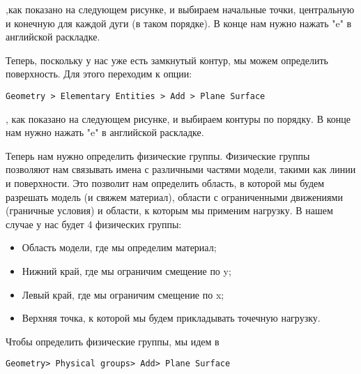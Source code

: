 \documentclass[11pt]{article}
\begin{document}
,как показано на следующем рисунке, и выбираем начальные точки, центральную и конечную для каждой дуги (в таком порядке). В конце нам нужно нажать "e" в английской раскладке.

    \begin{center}
    \end{center} 

Теперь, поскольку у нас уже есть замкнутый контур, мы можем определить поверхность. Для этого переходим к опции: 

\begin{Verbatim}[commandchars=\\\{\}]
Geometry > Elementary Entities > Add > Plane Surface
\end{Verbatim}

, как показано на следующем рисунке, и выбираем контуры по порядку. В конце нам нужно нажать "e" в английской раскладке.
    
    \begin{center}
    \end{center}
        
Теперь нам нужно определить физические группы. Физические группы позволяют нам связывать имена с различными частями модели, такими как линии и поверхности. Это позволит нам определить область, в которой мы будем разрешать модель (и свяжем материал), области с ограниченными движениями (граничные условия) и области, к которым мы применим нагрузку. В нашем случае у нас будет 4 физических группы:
        
\begin{itemize}
  \item Область модели, где мы определим материал;
  \item Нижний край, где мы ограничим смещение по y;
  \item Левый край, где мы ограничим смещение по x;
  \item Верхняя точка, к которой мы будем прикладывать точечную нагрузку.
\end{itemize}     
        
Чтобы определить физические группы, мы идем в 

\begin{Verbatim}[commandchars=\\\{\}]
Geometry> Physical groups> Add> Plane Surface
\end{Verbatim}
\end{document}
